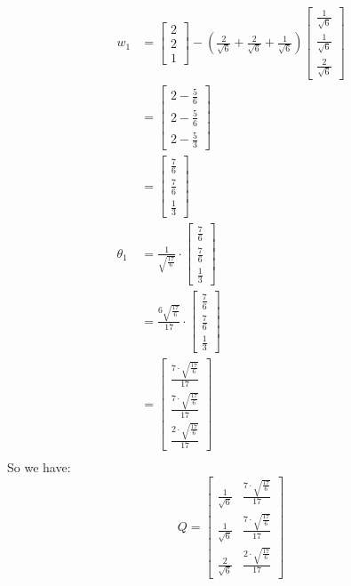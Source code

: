 \documentclass{article}
\begin{document}
\begin{align*}
w_{1} &= \begin{bmatrix}2 \\2 \\1\end{bmatrix} - (\frac{2}{\sqrt{6}} + \frac{2}{\sqrt{6}} + \frac{1}{\sqrt{6}}) \begin{bmatrix}\frac{1}{\sqrt{6}} \\ \frac{1}{\sqrt{6}} \\ \frac{2}{\sqrt{6}} \end{bmatrix} \\
&= \begin{bmatrix}2 - \frac{5}{6} \\ 2 - \frac{5}{6} \\ 2 - \frac{5}{3}\end{bmatrix} \\ 
&= \begin{bmatrix}\frac{7}{6} \\ \frac{7}{6} \\ \frac{1}{3} \end{bmatrix} \\ 
\theta_{1} &= \frac{1}{\sqrt{\frac{17}{6}}} \cdot \begin{bmatrix}\frac{7}{6} \\ \frac{7}{6} \\ \frac{1}{3} \end{bmatrix} \\
&= \frac{6 \sqrt{\frac{17}{6}}}{17} \cdot \begin{bmatrix}\frac{7}{6} \\ \frac{7}{6} \\ \frac{1}{3} \end{bmatrix} \\
&= \begin{bmatrix}\frac{7 \cdot \sqrt{\frac{17}{6}}}{17} \\ \frac{7 \cdot \sqrt{\frac{17}{6}}}{17} \\ \frac{2 \cdot  \sqrt{\frac{17}{6}}}{17} \end{bmatrix} \\
\end{align*}
So we have: \\
\[
Q = \begin{bmatrix}
\frac{1}{\sqrt{6}} & \frac{7 \cdot \sqrt{\frac{17}{6}}}{17} \\ \frac{1}{\sqrt{6}} & \frac{7 \cdot \sqrt{\frac{17}{6}}}{17} \\ \frac{2}{\sqrt{6}} & \frac{2 \cdot  \sqrt{\frac{17}{6}}}{17}
\end{bmatrix}
\]
\end{document}

